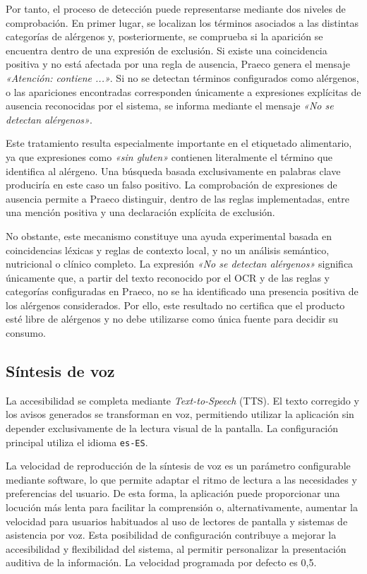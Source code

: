 Por tanto, el proceso de detección puede representarse mediante dos niveles de comprobación. En primer lugar, se localizan los términos asociados a las distintas categorías de alérgenos y, posteriormente, se comprueba si la aparición se encuentra dentro de una expresión de exclusión. Si existe una coincidencia positiva y no está afectada por una regla de ausencia, Praeco genera el mensaje \textit{«Atención: contiene ...»}. Si no se detectan términos configurados como alérgenos, o las apariciones encontradas corresponden únicamente a expresiones explícitas de ausencia reconocidas por el sistema, se informa mediante el mensaje \textit{«No se detectan alérgenos»}.

Este tratamiento resulta especialmente importante en el etiquetado alimentario, ya que expresiones como \textit{«sin gluten»} contienen literalmente el término que identifica al alérgeno. Una búsqueda basada exclusivamente en palabras clave produciría en este caso un falso positivo. La comprobación de expresiones de ausencia permite a Praeco distinguir, dentro de las reglas implementadas, entre una mención positiva y una declaración explícita de exclusión.

No obstante, este mecanismo constituye una ayuda experimental basada en coincidencias léxicas y reglas de contexto local, y no un análisis semántico, nutricional o clínico completo. La expresión \textit{«No se detectan alérgenos»} significa únicamente que, a partir del texto reconocido por el OCR y de las reglas y categorías configuradas en Praeco, no se ha identificado una presencia positiva de los alérgenos considerados. Por ello, este resultado no certifica que el producto esté libre de alérgenos y no debe utilizarse como única fuente para decidir su consumo.

\subsection{Síntesis de voz}

La accesibilidad se completa mediante \textit{Text-to-Speech} (TTS). El texto corregido y los avisos generados se transforman en voz, permitiendo utilizar la aplicación sin depender exclusivamente de la lectura visual de la pantalla. La configuración principal utiliza el idioma \texttt{es-ES}.

La velocidad de reproducción de la síntesis de voz es un parámetro configurable mediante software, lo que permite adaptar el ritmo de lectura a las necesidades y preferencias del usuario. De esta forma, la aplicación puede proporcionar una locución más lenta para facilitar la comprensión o, alternativamente, aumentar la velocidad para usuarios habituados al uso de lectores de pantalla y sistemas de asistencia por voz. Esta posibilidad de configuración contribuye a mejorar la accesibilidad y flexibilidad del sistema, al permitir personalizar la presentación auditiva de la información. La velocidad programada por defecto es 0,5.

